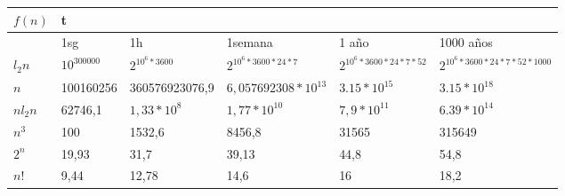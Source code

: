 \documentclass[11pt]{article}
\begin{document}
\begin{tabular}{|l|l|llll}
\cline{1-2}
$f(n)$  & t             &                                       &                                              &                                                  &                                                        \\ \hline
        & 1sg           & \multicolumn{1}{l|}{1h}               & \multicolumn{1}{l|}{1semana}                 & \multicolumn{1}{l|}{1 año}                       & \multicolumn{1}{l|}{1000 años}                         \\ \hline
$l_2n$  & $10^{300000}$ & \multicolumn{1}{l|}{$2^{10^6 *3600}$} & \multicolumn{1}{l|}{$2^{10^6 *3600 * 24*7}$} & \multicolumn{1}{l|}{$2^{10^6*3600 * 24*7 * 52}$} & \multicolumn{1}{l|}{$2^{10^6 *3600 * 24*7 * 52*1000}$} \\ \hline
$n$     & 100160256     & \multicolumn{1}{l|}{360576923076,9}   & \multicolumn{1}{l|}{$6,057692308*10^{13}$}   & \multicolumn{1}{l|}{$3.15*10^{15}$}              & \multicolumn{1}{l|}{$3.15*10^{18}$}                    \\ \hline
$nl_2n$ & 62746,1       & \multicolumn{1}{l|}{$1,33*10^8$}      & \multicolumn{1}{l|}{$1,77*10^{10}$}          & \multicolumn{1}{l|}{$7,9*10^{11}$}               & \multicolumn{1}{l|}{$6.39*10^{14}$}                    \\ \hline
$n^3$   & 100           & \multicolumn{1}{l|}{1532,6}           & \multicolumn{1}{l|}{8456,8}                  & \multicolumn{1}{l|}{31565}                       & \multicolumn{1}{l|}{315649}                            \\ \hline
$2^n$   & 19,93         & \multicolumn{1}{l|}{31,7}             & \multicolumn{1}{l|}{39,13}                   & \multicolumn{1}{l|}{44,8}                        & \multicolumn{1}{l|}{54,8}                              \\ \hline
$n!$    & 9,44          & \multicolumn{1}{l|}{12,78}            & \multicolumn{1}{l|}{14,6}                    & \multicolumn{1}{l|}{16}                          & \multicolumn{1}{l|}{18,2}                              \\ \hline
\end{tabular}
\end{document}
